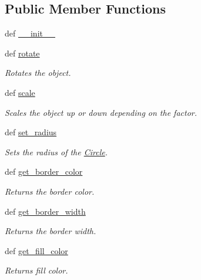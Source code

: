 \subsection*{Public Member Functions}
\begin{DoxyCompactItemize}
\item 
def \hyperlink{classcs110graphics_1_1Circle_a7c92c173c0e9666d0682c48fbd170e9f}{\_\-\_\-init\_\-\_\-}
\item 
def \hyperlink{classcs110graphics_1_1Circle_a0532651c10c084766ac3032c57107eb0}{rotate}
\begin{DoxyCompactList}\small\item\em Rotates the object. \item\end{DoxyCompactList}\item 
def \hyperlink{classcs110graphics_1_1Circle_a9ffed9eb3f191fafadd5b2d7e7735c18}{scale}
\begin{DoxyCompactList}\small\item\em Scales the object up or down depending on the factor. \item\end{DoxyCompactList}\item 
def \hyperlink{classcs110graphics_1_1Circle_a39b0cb138b31565d2a52180a2b03cc31}{set\_\-radius}
\begin{DoxyCompactList}\small\item\em Sets the radius of the \hyperlink{classcs110graphics_1_1Circle}{Circle}. \item\end{DoxyCompactList}\item 
def \hyperlink{classcs110graphics_1_1Fillable_a6772d56158c9fe98a33f01d47cb8aa41}{get\_\-border\_\-color}
\begin{DoxyCompactList}\small\item\em Returns the border color. \item\end{DoxyCompactList}\item 
def \hyperlink{classcs110graphics_1_1Fillable_a6ed7a4288e84a090ec185c8bdff21d0f}{get\_\-border\_\-width}
\begin{DoxyCompactList}\small\item\em Returns the border width. \item\end{DoxyCompactList}\item 
def \hyperlink{classcs110graphics_1_1Fillable_a16c045bc9b63961b696914ee1a1d14d9}{get\_\-fill\_\-color}
\begin{DoxyCompactList}\small\item\em Returns fill color. \item\end{DoxyCompactList}\item 

\end{DoxyCompactItemize}
